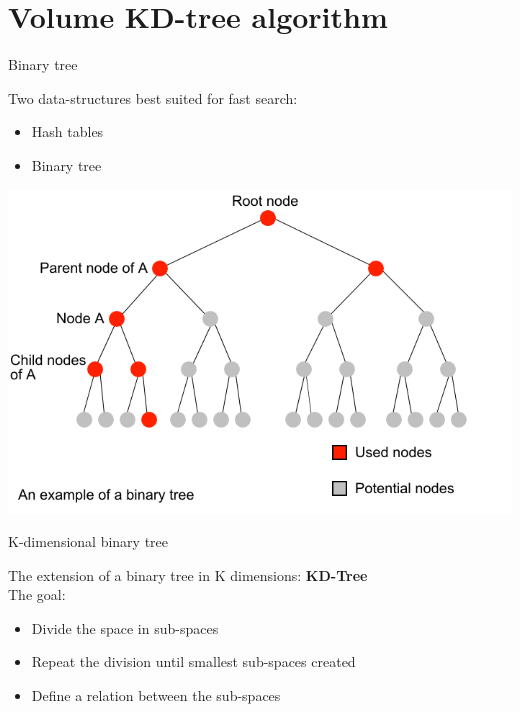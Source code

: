 \documentclass{beamer}
\begin{document}
\section{Volume KD-tree algorithm}

\begin{frame}{Binary tree}
\begin{center}
Two data-structures best suited for fast search:
\begin{itemize}
\item Hash tables
\item Binary tree
\end{itemize}
\includegraphics[scale=0.3]{images/binary_tree.png}\\
\end{center}
\end{frame}

\begin{frame}{K-dimensional binary tree}
\begin{center}
\vspace{2cm}
The extension of a binary tree in K dimensions: \textbf{KD-Tree}\\
\vspace{2cm}
The goal:
\begin{itemize}
\item Divide the space in sub-spaces
\item Repeat the division until smallest sub-spaces created
\item Define a relation between the sub-spaces
\end{itemize}
\end{center}
\end{frame}
\end{document}
